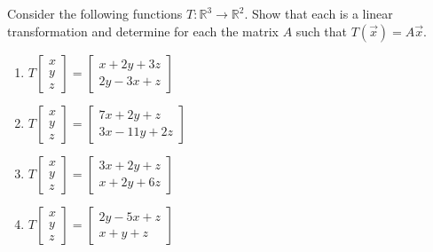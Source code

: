 \documentclass{ximera}
\begin{document}
\begin{problem}\label{prb:10.98} Consider the following functions $T:\mathbb{R}^{3}\rightarrow \mathbb{R}^{2}$.
Show that each is a linear transformation and determine for each the matrix $A$ such that
$T(\vec{x})=A\vec{x}$.

\begin{enumerate}
\item $T\left[
\begin{array}{c}
x \\
y \\
z
\end{array}
\right] =\left[
\begin{array}{c}
x+2y+3z \\
2y-3x+z
\end{array}
\right] $

\item $T\left[
\begin{array}{c}
x \\
y \\
z
\end{array}
\right] =\left[
\begin{array}{c}
7x+2y+z \\
3x-11y+2z
\end{array}
\right] $

\item $T\left[
\begin{array}{c}
x \\
y \\
z
\end{array}
\right] =\left[
\begin{array}{c}
3x+2y+z \\
x+2y+6z
\end{array}
\right] $

\item $T\left[
\begin{array}{c}
x \\
y \\
z
\end{array}
\right] =\left[
\begin{array}{c}
2y-5x+z \\
x+y+z
\end{array}
\right] $
\end{enumerate}
\end{problem}
\end{document}
